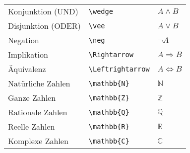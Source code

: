 \begin{longtable}{l l l}
    \midrule
    Konjunktion (UND)         & \texttt{\textbackslash wedge}                                                           & $ A \wedge B $                       \\
    Disjunktion (ODER)        & \texttt{\textbackslash vee}                                                             & $ A \vee B $                         \\
    Negation                  & \texttt{\textbackslash neg}                                                             & $ \neg A $                           \\
    Implikation               & \texttt{\textbackslash Rightarrow}                                                      & $ A \Rightarrow B $                  \\
    Äquivalenz                & \texttt{\textbackslash Leftrightarrow}                                                  & $ A \Leftrightarrow B $              \\

    \midrule
    Natürliche Zahlen         & \texttt{\textbackslash mathbb\{N\}}                                                     & \( \mathbb{N} \)                     \\
    Ganze Zahlen              & \texttt{\textbackslash mathbb\{Z\}}                                                     & \( \mathbb{Z} \)                     \\
    Rationale Zahlen          & \texttt{\textbackslash mathbb\{Q\}}                                                     & \( \mathbb{Q} \)                     \\
    Reelle Zahlen             & \texttt{\textbackslash mathbb\{R\}}                                                     & \( \mathbb{R} \)                     \\
    Komplexe Zahlen           & \texttt{\textbackslash mathbb\{C\}}                                                     & \( \mathbb{C} \)                     \\


\end{longtable}
